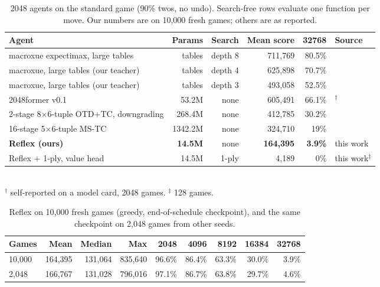\documentclass{article}
\newcommand{\method}{Reflex}
\begin{document}
\begin{table}[t]
\centering
\caption{2048 agents on the standard game (90\% twos, no undo). Search-free rows evaluate one function per move. Our numbers are on 10{,}000 fresh games; others are as reported.}
\label{tab:main}
\small
\begin{tabular}{lrrrrl}
\toprule
Agent & Params & Search & Mean score & 32768 & Source \\
\midrule
macroxue expectimax, large tables & tables & depth 8 & 711{,}769 & 80.5\% & \citep{xue2022macroxue} \\
macroxue, large tables (our teacher) & tables & depth 4 & 625{,}898 & 70.7\% & \citep{xue2022macroxue} \\
macroxue, large tables (our teacher) & tables & depth 3 & 493{,}058 & 52.5\% & \citep{xue2022macroxue} \\
\midrule
2048former v0.1 & 53.2M & none & 605{,}491 & 66.1\% & \citep{keisling2025former}$^\dagger$ \\
2-stage 8$\times$6-tuple OTD+TC, downgrading & 268.4M & none & 412{,}785 & 30.2\% & \citep{guei2021optimistic} \\
16-stage 5$\times$6-tuple MS-TC & 1342.2M & none & 324{,}710 & 19\% & \citep{jaskowski2016mastering} \\
\textbf{\method{} (ours)} & \textbf{14.5M} & none & \textbf{164{,}395} & \textbf{3.9\%} & this work \\
\method{} + 1-ply, value head & 14.5M & 1-ply & 4{,}189 & 0\% & this work$^\ddagger$ \\
\bottomrule
\end{tabular}\\[2pt]
{\footnotesize $^\dagger$ self-reported on a model card, 2048 games. $^\ddagger$ 128 games.}
\end{table}

\begin{table}[t]
\centering
\caption{\method{} on 10{,}000 fresh games (greedy, end-of-schedule checkpoint), and the same checkpoint on 2{,}048 games from other seeds.}
\label{tab:tiles}
\small
\begin{tabular}{lrrrrrrrr}
\toprule
Games & Mean & Median & Max & 2048 & 4096 & 8192 & 16384 & 32768 \\
\midrule
10{,}000 & 164{,}395 & 131{,}064 & 835{,}640 & 96.6\% & 86.4\% & 63.3\% & 30.0\% & 3.9\% \\
2{,}048 & 166{,}767 & 131{,}028 & 796{,}016 & 97.1\% & 86.7\% & 63.8\% & 29.7\% & 4.6\% \\
\bottomrule
\end{tabular}
\end{table}
\end{document}
